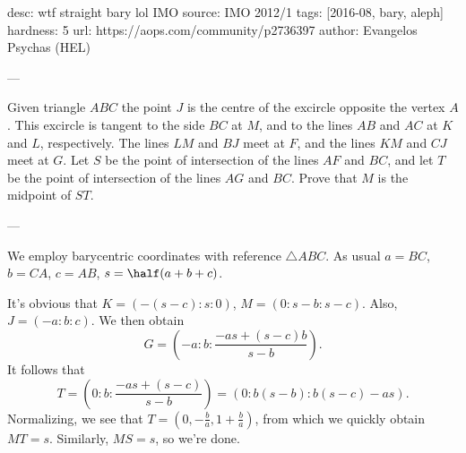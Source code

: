 desc: wtf straight bary lol IMO
source: IMO 2012/1
tags: [2016-08, bary, aleph]
hardness: 5
url: https://aops.com/community/p2736397
author: Evangelos Psychas (HEL)

---

Given triangle $ABC$ the point $J$ is the centre of the excircle
opposite the vertex $A$. This excircle is tangent to the side $BC$ at
$M$, and to the lines $AB$ and $AC$ at $K$ and $L$, respectively. The
lines $LM$ and $BJ$ meet at $F$, and the lines $KM$ and $CJ$ meet at
$G$. Let $S$ be the point of intersection of the lines $AF$ and $BC$,
and let $T$ be the point of intersection of the lines $AG$ and $BC$.
Prove that $M$ is the midpoint of $ST$.

---

We employ barycentric coordinates with reference $\triangle ABC$.
As usual $a = BC$, $b = CA$, $c = AB$, $s = \half(a+b+c)$.

It's obvious that $K = ( -(s-c): s : 0)$, $M = ( 0 : s-b : s-c)$.
Also, $J = (-a : b : c)$.
We then obtain
\[ G = \left( -a: b : \frac{-as + (s-c)b}{s-b} \right). \]
It follows that
\[ T = \left( 0 : b : \frac{-as + (s-c)}{s-b} \right) = ( 0 : b(s-b) : b(s-c) - as). \]
Normalizing, we see that $T = \left( 0, -\frac{b}{a}, 1 + \frac{b}{a} \right)$,
from which we quickly obtain $MT = s$.
Similarly, $MS = s$, so we're done.
